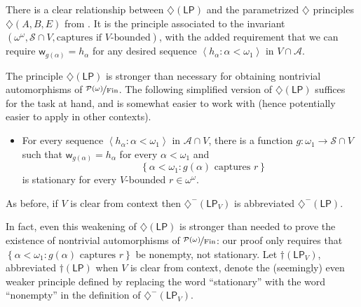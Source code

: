 \documentclass[11pt,leqno]{amsart}
\theoremstyle{definition}
\theoremstyle{remark}
\newcommand{\A}{\mathcal{A}}
\newcommand{\explicitSet}[1]{\left\lbrace #1 \right\rbrace}
\newcommand{\brackets}[1]{\left\langle #1 \right\rangle}
\newcommand{\set}[2]{\explicitSet{#1 \colon #2}}
\newcommand{\seq}[2]{\brackets{#1 \colon #2}}
\newcommand{\<}{\langle}
\renewcommand{\>}{\rangle}
\renewcommand{\a}{\alpha}
\newcommand{\w}{\omega}
\newcommand{\0}{\emptyset}
\newcommand{\1}{1\hspace{-1.75mm}1}
\newcommand{\pwmf}{\nicefrac{\mathcal{P}(\w)}{\mathrm{Fin}}}
\newcommand{\dLP}{\diamondsuit(\mathsf{LP})}
\newcommand{\dLPm}{\diamondsuit^-(\mathsf{LP})}
\begin{document}
There is a clear relationship between $\dLP$ and the parametrized $\diamondsuit$ principles $\diamondsuit(A,B,E)$ from \cite{MHD}. It is the principle associated to the invariant $(\w^\w,\mathcal S \cap V,\text{captures if $V$-bounded})$, with the added requirement that we can require $\mathsf w_{g(\a)} = h_\a$ for any desired sequence $\seq{h_\a}{\a < \w_1}$ in $V \cap \A$. 

The principle $\dLP$ is stronger than necessary for obtaining nontrivial automorphisms of $\pwmf$. 
The following simplified version of $\dLP$ suffices for the task at hand, and is somewhat easier to work with (hence potentially easier to apply in other contexts). 

\smallskip
\begin{itemize}
\item[$\diamondsuit^-(\mathsf{LP}_V):\hspace{-7mm}$]\hspace{7mm} 
For every sequence $\seq{h_\a}{\a < \w_1}$ in $\A \cap V$, 
there is a function $g: \w_1 \to \mathcal S \cap V$ such that $\mathsf w_{g(\a)} = h_\a$ for every $\a < \w_1$ and 
$$\qquad \ \ \ \set{\a < \w_1}{g(\a) \text{ captures } r}$$
is stationary for every $V$-bounded $r \in \w^\w$. 
\end{itemize}
\smallskip
As before, if $V$ is clear from context then $\diamondsuit^-(\mathsf{LP}_V)$ is abbreviated $\dLPm$. 

In fact, even this weakening of $\dLP$ is stronger than needed to prove the existence of nontrivial automorphisms of $\pwmf$: our proof only requires that $\set{\a < \w_1}{g(\a) \text{ captures } r}$ be nonempty, not stationary. 
Let $\dagger(\mathsf{LP}_V)$, abbreviated $\dagger(\mathsf{LP})$ when $V$ is clear from context, denote the (seemingly) even weaker principle defined by replacing the word ``stationary'' with the word ``nonempty'' in the definition of $\diamondsuit^-(\mathsf{LP}_V)$.
\end{document}
